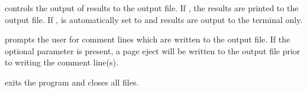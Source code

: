 \filbreak
{} {
 controls the output of results to the output file.  If
, the results are printed to the output file. If ,
 is automatically set to  and results are output to
the terminal only.
}

\filbreak
{} {
 prompts the user for  comment lines which
are written to the output file.  If the optional parameter  is
present, a page eject will be written to the output file prior to
writing the comment line(s). 
}

\filbreak
{} {
 exits the program and closes all files.
}

